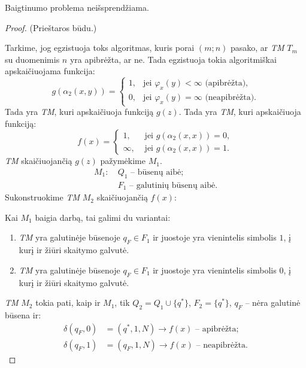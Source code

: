\begin{prop}
  Baigtinumo problema neišsprendžiama.
  \begin{proof}
    (Prieštaros būdu.)

    Tarkime, jog egzistuoja toks algoritmas, kuris porai $(m; n)$ pasako,
    ar \emph{TM} $T_{m}$ su duomenimis $n$ yra apibrėžta, ar ne. Tada
    egzistuoja tokia algoritmiškai apskaičiuojama funkcija:
    \[
    g(\alpha_{2}(x,y)) =%
    \begin{cases}
      1, & \text{jei } \varphi_{x}(y) < \infty \text{ (apibrėžta)}, \\
      0, & \text{jei } \varphi_{x}(y) = \infty \text{ (neapibrėžta)}.
    \end{cases}
    \]
    Tada yra \emph{TM}, kuri apskaičiuoja funkciją $g(z)$.
    Tada yra \emph{TM}, kuri apskaičiuoja funkciją:
    \[
    f(x) =%
    \begin{cases}
      1, & \text{ jei } g(\alpha_{2}(x,x)) = 0, \\
      \infty, & \text{ jei } g(\alpha_{2}(x,x)) = 1.
    \end{cases}
    \]
    \emph{TM} skaičiuojančią $g(z)$ pažymėkime $M_{1}$.
    \begin{align*}
      M_{1}: & \: Q_{1} \text{ – būsenų aibė;} \\
      & \: F_{1} \text{ – galutinių būsenų aibė.}
    \end{align*}
    Sukonstruokime \emph{TM} $M_{2}$ skaičiuojančią $f(x)$:

    Kai $M_{1}$ baigia darbą, tai galimi du variantai:
    \begin{enumerate}
      \item \emph{TM} yra galutinėje būsenoje $q_{F} \in F_{1}$ ir 
        juostoje yra vienintelis simbolis $1$, į kurį ir žiūri 
        skaitymo galvutė.
      \item \emph{TM} yra galutinėje būsenoje $q_{F} \in F_{1}$ ir 
        juostoje yra vienintelis simbolis $0$, į kurį ir žiūri 
        skaitymo galvutė.
    \end{enumerate}
    \emph{TM} $M_{2}$ tokia pati, kaip ir $M_{1}$, tik 
    $Q_{2} = Q_{1} \cup \{ q^{*} \}$, $F_{2} = \{ q^{*} \}$, 
    $q_{F}$ – nėra galutinė būsena ir:
    \begin{align*}
      \delta(q_{F},0) & = (q^{*}, 1, N) \to f(x)\text{ – apibrėžta;}\\
      \delta(q_{F},1) & = (q_{F}, 1, N) \to f(x)\text{ – neapibrėžta.}
    \end{align*}


\end{proof}
\end{prop}
